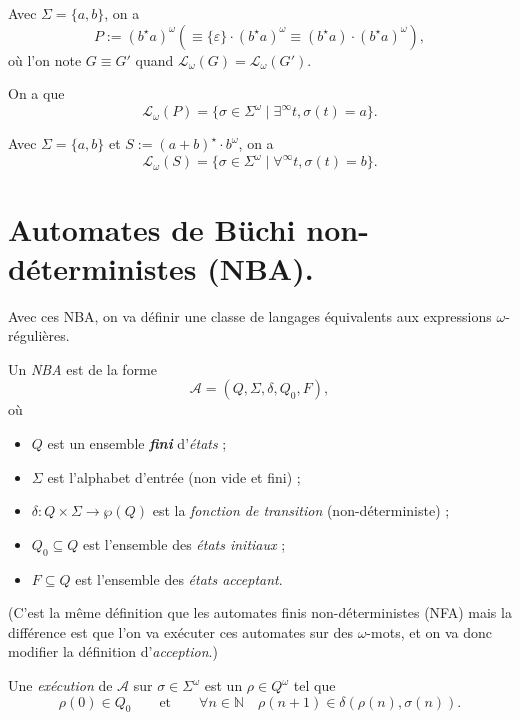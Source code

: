 \documentclass[./main]{subfiles}
\begin{document}
  \begin{exm}
    Avec $\Sigma = \{a, b\}$, on a
    \[
    P := (b^\star a)^\omega (\equiv \{\varepsilon\} \cdot (b^\star a)^\omega \equiv (b^\star a) \cdot (b^\star a)^\omega)
    ,\]
    où l'on note $G \equiv G'$ quand $\mathcal{L}_\omega(G) = \mathcal{L}_\omega(G')$.

    On a que \[
      \mathcal{L}_\omega(P) = \{\sigma \in \Sigma^\omega  \mid \exists^\infty t,  \sigma(t) = a\} 
    .\]
  \end{exm}

  \begin{exm}
    Avec $\Sigma = \{a, b\}$ et $S := (a+b)^\star \cdot b^\omega$,
    on a 
    \[
    \mathcal{L}_\omega(S) = \{\sigma \in \Sigma^\omega  \mid \forall^\infty t, \sigma(t) = b\} 
    .\]
  \end{exm}


  \section{Automates de Büchi non-déterministes (NBA).}

  Avec ces NBA, on va définir une classe de langages équivalents aux expressions $\omega$-régulières.

  \begin{defn}
    Un \textit{NBA} est de la forme 
    \[
    \mathcal{A} = (Q, \Sigma, \delta, Q_0, F)
    ,\]
    où
    \begin{itemize}
      \item $Q$ est un ensemble \textit{\textbf{fini}} d'\textit{états} ;
      \item $\Sigma$ est l'alphabet d'entrée (non vide et fini) ;
      \item $\delta : Q \times \Sigma \to \wp(Q)$ est la \textit{fonction de transition} (non-déterministe) ;
      \item $Q_0 \subseteq Q$ est l'ensemble des \textit{états initiaux} ;
      \item $F \subseteq Q$ est l'ensemble des \textit{états acceptant}.
    \end{itemize}
  \end{defn}

  (C'est la même définition que les automates finis non-déterministes (NFA) mais la différence est que l'on va exécuter ces automates sur des $\omega$-mots, et on va donc modifier la définition d'\textit{acception}.)

  \begin{defn}
    Une \textit{exécution} de $\mathcal{A}$ sur $\sigma \in \Sigma^\omega$ est un $\rho \in Q^\omega$ tel que 
    \[
      \rho(0) \in Q_0 \quad\quad\text{et}\quad\quad\forall n \in \mathds{N} \quad \rho(n+1) \in \delta(\rho(n), \sigma(n))
    .\]
  \end{defn}
\end{document}
